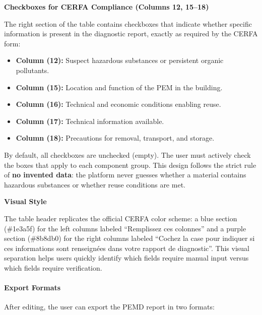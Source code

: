 \documentclass[11pt,a4paper]{article}
\begin{document}
\noindent\textbf{Checkboxes for CERFA Compliance (Columns 12, 15--18)}

The right section of the table contains checkboxes that indicate whether specific information is present in the diagnostic report, exactly as required by the CERFA form:

\begin{itemize}
    \item \textbf{Column (12):} Suspect hazardous substances or persistent organic pollutants.
    \item \textbf{Column (15):} Location and function of the PEM in the building.
    \item \textbf{Column (16):} Technical and economic conditions enabling reuse.
    \item \textbf{Column (17):} Technical information available.
    \item \textbf{Column (18):} Precautions for removal, transport, and storage.
\end{itemize}

By default, all checkboxes are unchecked (empty). The user must actively check the boxes that apply to each component group. This design follows the strict rule of \textbf{no invented data}: the platform never guesses whether a material contains hazardous substances or whether reuse conditions are met.

\noindent\textbf{Visual Style}

The table header replicates the official CERFA color scheme: a blue section (\#1e3a5f) for the left columns labeled ``Remplissez ces colonnes'' and a purple section (\#8b8db0) for the right columns labeled ``Cochez la case pour indiquer si ces informations sont renseign\'{e}es dans votre rapport de diagnostic''. This visual separation helps users quickly identify which fields require manual input versus which fields require verification.

\paragraph{Export Formats}

After editing, the user can export the PEMD report in two formats:
\end{document}
